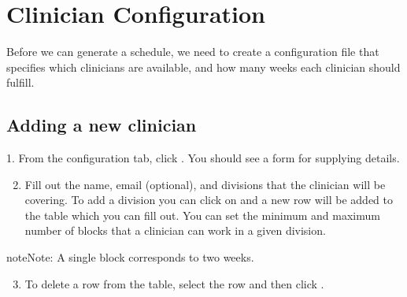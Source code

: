 \documentclass[letterpaper,10pt,english]{sphinxmanual}
\begin{document}
\section{Clinician Configuration}
\label{\detokenize{index:clinician-configuration}}\label{\detokenize{index:id2}}
Before we can generate a schedule, we need to create a configuration file
that specifies which clinicians are available, and how many weeks each
clinician should fulfill.


\subsection{Adding a new clinician}
\label{\detokenize{index:adding-a-new-clinician}}
1. From the configuration tab, click . You should see a
form for supplying details.

\begin{figure}[htbp]
\centering
{}\end{figure}

\begin{DUlineblock}{0em}
\item[] 
\end{DUlineblock}
\begin{enumerate}
\setcounter{enumi}{1}
\item {} 
Fill out the name, email (optional), and divisions that the clinician
will be covering. To add a division you can click on  and a new row
will be added to the table which you can fill out. You can set the minimum
and maximum number of blocks that a clinician can work in a given division.

\end{enumerate}

\begin{sphinxadmonition}{note}{Note:}
A single block corresponds to two weeks.
\end{sphinxadmonition}

\begin{figure}[htbp]
\centering
{}\end{figure}

\begin{DUlineblock}{0em}
\item[] 
\end{DUlineblock}
\begin{enumerate}
\setcounter{enumi}{2}
\item {} 
To delete a row from the table, select the row and then click .

\end{enumerate}
\end{document}
